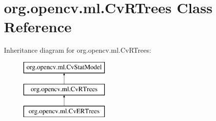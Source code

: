 \hypertarget{classorg_1_1opencv_1_1ml_1_1_cv_r_trees}{}\section{org.\+opencv.\+ml.\+Cv\+R\+Trees Class Reference}
\label{classorg_1_1opencv_1_1ml_1_1_cv_r_trees}
Inheritance diagram for org.\+opencv.\+ml.\+Cv\+R\+Trees\+:\begin{figure}[H]
\begin{center}
\leavevmode
\includegraphics[height=3.000000cm]{classorg_1_1opencv_1_1ml_1_1_cv_r_trees}
\end{center}
\end{figure}

